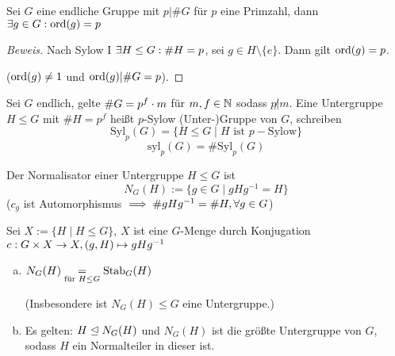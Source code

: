 \documentclass[a4paper]{report}
\begin{document}
\begin{kor}
  Sei $G$ eine endliche Gruppe mit $p | \#G$ für $p$ eine Primzahl, dann $\exists g \in G : \operatorname{ord}(g) = p$
  \begin{proof}[Beweis]
    Nach Sylow I $\exists H \le G : \#H = p$, sei $g \in H \setminus \{e\}$. Dann gilt $\operatorname{ord}(g) = p$.

    ($\operatorname{ord}(g) \ne 1$ und $\operatorname{ord}(g) | \#G=p$).
  \end{proof}
\end{kor}

\begin{defi}
  Sei $G$ endlich, gelte $\#G = p^{f} \cdot m$ für $m, f \in \mathbb{N}$ sodass $p \not | m$. Eine Untergruppe $H \le G$ mit $\#H = p^{f}$ heißt $p$-Sylow (Unter-)Gruppe von $G$, schreiben \[\mathrm{Syl}_{p}(G) = \{H \le G \mid H \text{ ist }p-\text{Sylow}\}\]
  \[\mathrm{syl}_p(G) = \#\mathrm{Syl}_{p}(G)\]
\end{defi}

\begin{defi}
  Der Normalisator einer Untergruppe $H \le G$ ist \[N_{G}(H):=\{g \in G \mid gHg^{-1} = H\}\]
  ($c_{g}$ ist Automorphismus $\implies \#gHg^{-1} = \#H, \forall g \in G$)
\end{defi}


\begin{int*}
Sei $X:= \{H \mid H \le G\}$, $X$ ist eine $G$-Menge durch Konjugation $c: G \times X \to X, (g, H) \mapsto gHg^{-1}$
\end{int*}


\begin{prop}[Übung]
\begin{enumerate}[(a)]
  \item $N_{G}(H) \underset{\text{für }H \le G} = \operatorname{Stab}_{G}(H)$

        (Insbesondere ist $N_{G}(H) \le G$ eine Untergruppe.)
  \item Es gelten: $H \trianglelefteq N_{G}(H)$ und $N_{G}(H)$ ist die größte Untergruppe von $G$, sodass $H$ ein Normalteiler in dieser ist.
\end{enumerate}
\end{prop}
\end{document}
